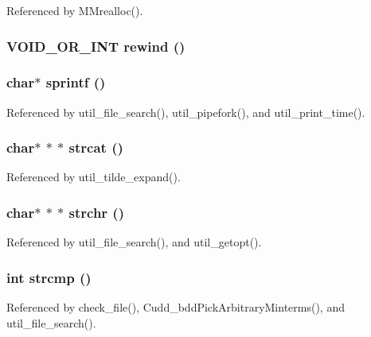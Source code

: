 Referenced by MMrealloc().
\subsubsection{\setlength{\rightskip}{0pt plus 5cm}VOID\_\-OR\_\-INT rewind ()}\label{util_8h_e2b2e315e3ea9a02c2a330855b582ec7}


\subsubsection{\setlength{\rightskip}{0pt plus 5cm}char$\ast$ sprintf ()}\label{util_8h_e30b24f4135d065afbb6431104e52a89}




Referenced by util\_\-file\_\-search(), util\_\-pipefork(), and util\_\-print\_\-time().
\subsubsection{\setlength{\rightskip}{0pt plus 5cm}char$\ast$ $\ast$ $\ast$ strcat ()}\label{util_8h_ffb1ae157eea132fa626910616787806}




Referenced by util\_\-tilde\_\-expand().
\subsubsection{\setlength{\rightskip}{0pt plus 5cm}char$\ast$ $\ast$ $\ast$ strchr ()}\label{util_8h_5d1a406cc83ccfe2ce76a8f61af58537}




Referenced by util\_\-file\_\-search(), and util\_\-getopt().
\subsubsection{\setlength{\rightskip}{0pt plus 5cm}int strcmp ()}\label{util_8h_7e3fe9a43bbdc5abae963874b6a63e6b}




Referenced by check\_\-file(), Cudd\_\-bdd\-Pick\-Arbitrary\-Minterms(), and util\_\-file\_\-search().
